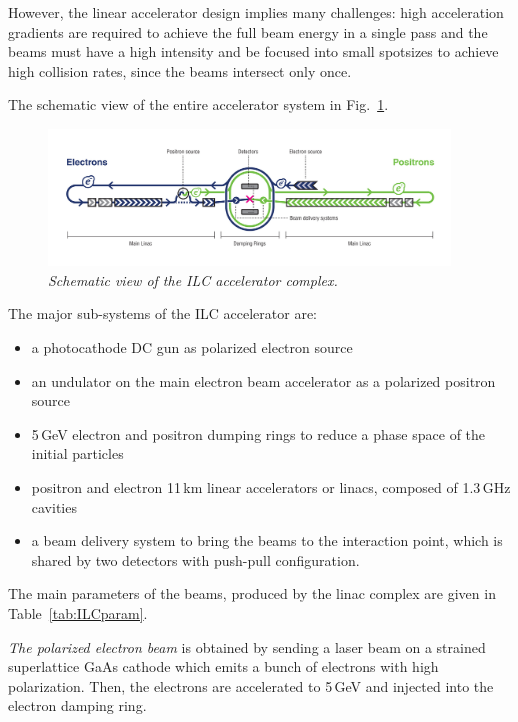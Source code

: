 However, the linear accelerator design implies many challenges: high acceleration gradients are required to achieve the full beam energy in a single pass and the beams must have a high intensity and be focused into small spotsizes to achieve high collision rates, since the beams intersect only once.

The schematic view of the entire accelerator system in  Fig.~\ref{fig:ILCScheme}. 
\begin{figure}
{\centering
    \includegraphics[width=0.95\textwidth]{graphics/ILC_scheme.jpg}
    \caption{\sl Schematic view of the ILC accelerator complex.}
    \label{fig:ILCScheme}
  }
\end{figure}
The major sub-systems of the ILC accelerator are:
\begin{itemize}
\item a photocathode DC gun as polarized electron source
\item an undulator on the main electron beam accelerator as a polarized positron source
\item 5\,GeV electron and positron dumping rings to reduce a phase space of the initial particles
\item positron and electron 11\,km linear accelerators or linacs, composed of 1.3\,GHz cavities
\item a beam delivery system to bring the beams to the interaction point, which is shared by two detectors with push-pull configuration.
\end{itemize}
The main parameters of the beams, produced by the linac complex are given in Table~\ref{tab:ILCparam}.

\textit{The polarized electron beam} is obtained by sending a laser beam on a strained superlattice GaAs cathode which emits a bunch of electrons with high polarization. Then, the electrons are accelerated to 5\,GeV and injected into the electron damping ring.

